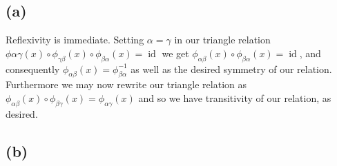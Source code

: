 \documentclass[english]{article}
\DeclareMathOperator{\id}{id}
\begin{document}
\subsection*{(a)}
Reflexivity is immediate.
Setting $\alpha=\gamma$ in our triangle relation $\phi{\alpha\gamma}(x)\circ \phi_{\gamma\beta}(x)\circ \phi_{\beta\alpha}(x)=\id$
we get $\phi_{\alpha\beta}(x)\circ \phi_{\beta\alpha}(x) = \id$, and consequently $\phi_{\alpha\beta}(x)=\phi_{\beta\alpha}^{-1}$
as well as the desired symmetry of our relation.
Furthermore we may now rewrite our triangle relation as $\phi_{\alpha\beta}(x)\circ \phi_{\beta\gamma}(x) = \phi_{\alpha\gamma}(x)$ 
and so we have transitivity of our relation, as desired.

\subsection*{(b)}
\end{document}
